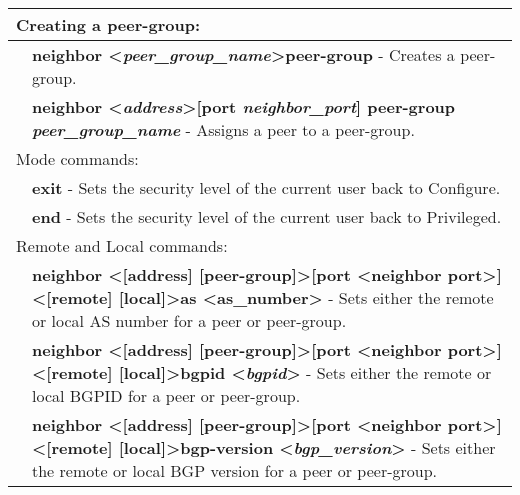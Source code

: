 \begin{tabular}{|p{10pt}p{400pt}|}

\hline

\multicolumn{2}{|l|}{Creating a peer-group:}\\ 

\hline

& {\bf \small neighbor \textless\emph{peer\_group\_name}\textgreater peer-group} - Creates a peer-group. \\[4pt]

& {\bf \small neighbor \textless\emph{address}\textgreater [port \emph{neighbor\_port}] peer-group \emph{peer\_group\_name}} - Assigns a peer to a peer-group. \\[4pt]

\hline

\multicolumn{2}{|l|}{Mode commands:}\\ 

\hline

& {\bf \small exit} - Sets the security level of the current user back to Configure. \\[4pt]

& {\bf \small end} - Sets the security level of the current user back to Privileged. \\[4pt]

\hline

\multicolumn{2}{|l|}{Remote and Local commands:}\\ 

\hline

& {\bf \small neighbor \textless[address] [peer-group]\textgreater [port \textless neighbor port\textgreater] \textless[remote] [local]\textgreater as \textless as\_number\textgreater } - Sets either the remote or local AS number for a peer or peer-group. \\[4pt]

& {\bf \small neighbor \textless[address] [peer-group]\textgreater [port \textless neighbor port\textgreater] \textless[remote] [local]\textgreater bgpid \textless\emph{bgpid}\textgreater} - Sets either the remote or local BGPID for a peer or peer-group. \\[4pt]

& {\bf \small neighbor \textless[address] [peer-group]\textgreater [port \textless neighbor port\textgreater] \textless[remote] [local]\textgreater bgp-version \textless\emph{bgp\_version}\textgreater} - Sets either the remote or local BGP version for a peer or peer-group. \\[4pt]


\end{tabular}
